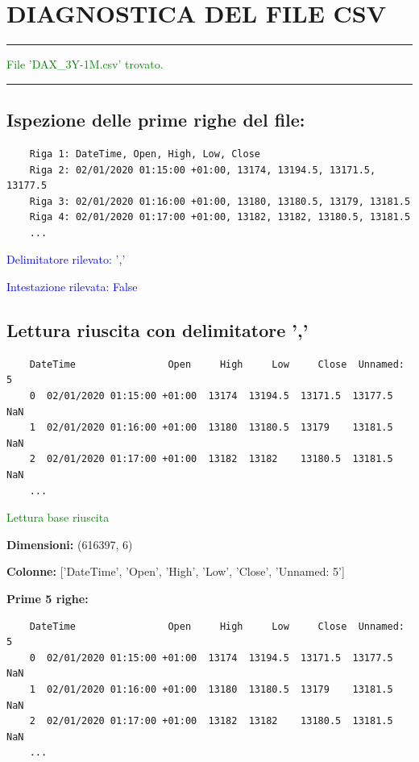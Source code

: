 \documentclass[%
	corpo=11pt,
    twoside,
    stile=classica,
    oldstyle,
    tipotesi=custom,
    greek,
    evenboxes,
]{toptesi}
\begin{document}
 \section*{DIAGNOSTICA DEL FILE CSV}
 
 \noindent\rule{\textwidth}{0.4pt}
 
 \textcolor{green}{File 'DAX\_3Y-1M.csv' trovato.}
 
 \noindent\rule{\textwidth}{0.4pt}
 
 \subsection*{Ispezione delle prime righe del file:}
 \begin{verbatim}
 	Riga 1: DateTime, Open, High, Low, Close
 	Riga 2: 02/01/2020 01:15:00 +01:00, 13174, 13194.5, 13171.5, 13177.5
 	Riga 3: 02/01/2020 01:16:00 +01:00, 13180, 13180.5, 13179, 13181.5
 	Riga 4: 02/01/2020 01:17:00 +01:00, 13182, 13182, 13180.5, 13181.5
 	...
 \end{verbatim}
 
 \textcolor{blue}{Delimitatore rilevato: ','}  
 
 \textcolor{blue}{Intestazione rilevata: False}  
 
 \subsection*{Lettura riuscita con delimitatore ','}
 \begin{verbatim}
 	DateTime                Open     High     Low     Close  Unnamed: 5
 	0  02/01/2020 01:15:00 +01:00  13174  13194.5  13171.5  13177.5      NaN
 	1  02/01/2020 01:16:00 +01:00  13180  13180.5  13179    13181.5      NaN
 	2  02/01/2020 01:17:00 +01:00  13182  13182    13180.5  13181.5      NaN
 	...
 \end{verbatim}
 
 \textcolor{green}{Lettura base riuscita}  
 
 \textbf{Dimensioni:} (616397, 6)  
 
 \textbf{Colonne:} ['DateTime', 'Open', 'High', 'Low', 'Close', 'Unnamed: 5']  
 
 \textbf{Prime 5 righe:}
 \begin{verbatim}
 	DateTime                Open     High     Low     Close  Unnamed: 5
 	0  02/01/2020 01:15:00 +01:00  13174  13194.5  13171.5  13177.5      NaN
 	1  02/01/2020 01:16:00 +01:00  13180  13180.5  13179    13181.5      NaN
 	2  02/01/2020 01:17:00 +01:00  13182  13182    13180.5  13181.5      NaN
 	...
 \end{verbatim}
 
\end{document}
